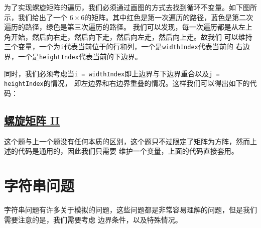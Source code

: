 \documentclass[../../main.tex]{subfiles}
\begin{document}
为了实现螺旋矩阵的遍历，我们必须通过画图的方式去找到循环不变量。如下图所示，我们给出了一个
$6 \times 6$的矩阵。其中红色是第一次遍历的路径，蓝色是第二次遍历的路径，绿色是第三次遍历的路径。
我们可以发现，每一次遍历都是从左上角开始，然后向右走，然后向下走，然后向左走，然后向上走。故我们
可以维持三个变量，一个为\texttt{i}代表当前位于的行和列，一个是\texttt{widthIndex}代表当前的
右边界，一个是\texttt{heightIndex}代表当前的下边界。


同时，我们必须考虑当\texttt{i = widthIndex}即上边界与下边界重合以及\texttt{j = heightIndex}的情况，
即左边界和右边界重叠的情况。这样我们可以得出如下的代码：



\subsection{\href{https://leetcode.cn/problems/spiral-matrix-ii/}{螺旋矩阵 II}}

这个题与上一个题没有任何本质的区别，这个题只不过限定了矩阵为方阵，然而上述的代码是通用的，因此我们只需要
维护一个变量，上面的代码直接套用。



\section{字符串问题}

字符串问题有许多关于模拟的问题，这些问题都是非常容易理解的问题，但是我们需要注意的是，我们需要考虑
边界条件，以及特殊情况。
\end{document}
